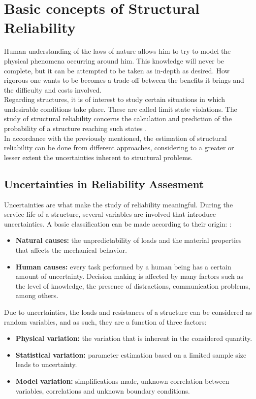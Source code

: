 \chapter{Basic concepts of Structural Reliability}
\label{ch:2}
Human understanding of the laws of nature allows him to try to model the physical phenomena
occurring around him. This knowledge will never be complete, but it can be attempted to be
taken as in-depth as desired. How rigorous one wants to be becomes a trade-off between
the benefits it brings and the difficulty and costs involved. \\

Regarding structures, it is of interest to study certain situations in which
undesirable conditions take place. These are called limit state violations.
The study of structural reliability concerns the calculation and prediction of
the probability of a structure reaching such states \citep{Melchers2018}. \\

In accordance with the previously mentioned, the estimation of structural reliability can be done from
different approaches, considering to a greater or lesser extent the uncertainties
inherent to structural problems. 

\section{Uncertainties in Reliability Assesment}
Uncertainties are what make the study of reliability meaningful. During the
service life of a structure, several variables are involved that introduce
uncertainties. A basic classification can be made according to their origin: \citep{Nowak2000}:
\begin{itemize}
    \item \textbf{Natural causes:} the unpredictability of loads and the material properties
    that affects the mechanical behavior.
    \item \textbf{Human causes:} every task performed by a human being has a
    certain amount of uncertainty. Decision making is affected by many factors
    such as the level of knowledge, the presence of distractions, communication
    problems, among others.
\end{itemize}
Due to uncertainties, the loads and resistances of a structure can be considered
as random variables, and as such, they are a function of three factors:
\begin{itemize}
    \item \textbf{Physical variation:} the variation that is inherent in the 
    considered quantity.
    \item \textbf{Statistical variation:} parameter estimation based on a
    limited sample size leads to uncertainty.
    \item \textbf{Model variation:} simplifications made, unknown correlation 
    between variables, correlations and unknown boundary conditions.
\end{itemize}

